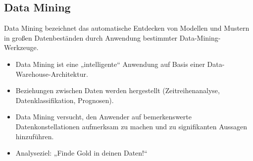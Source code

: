 \subsection{Data Mining}
Data Mining bezeichnet das automatische Entdecken von Modellen und Mustern in großen Datenbeständen durch Anwendung bestimmter Data-Mining-Werkzeuge.
\begin{itemize}
  \item Data Mining ist eine „intelligente“ Anwendung auf Basis einer Data-Warehouse-Architektur.
  \item Beziehungen zwischen Daten werden hergestellt (Zeitreihenanalyse, Datenklassifikation, Prognosen).
  \item Data Mining versucht, den Anwender auf bemerkenswerte Datenkonstellationen aufmerksam zu machen und zu signifikanten Aussagen hinzuführen.
  \item Analyseziel: „Finde Gold in deinen Daten!“
\end{itemize}

\newpage
